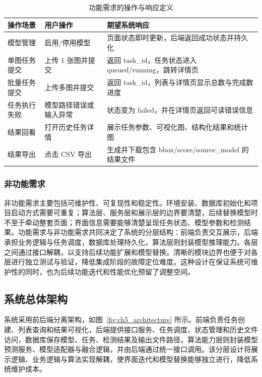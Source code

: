 \begin{table}[H]
  \centering
  \small
  \caption{功能需求的操作与响应定义}
  \label{tab:ch5_requirement_response}
  \begin{tabular}{p{3.2cm}p{4.6cm}p{5.1cm}}
    \toprule
    操作场景 & 用户操作 & 期望系统响应 \\
    \midrule
    模型管理 & 启用/停用模型 & 页面状态即时更新，后端返回成功状态并持久化 \\
    单图任务提交 & 上传 1 张图并提交 & 返回 task\_id，任务状态进入 queued/running，跳转详情页 \\
    批量任务提交 & 上传多图并提交 & 返回 task\_id，列表与详情页显示总数与完成数进度 \\
    任务执行失败 & 模型路径错误或输入异常 & 状态变为 failed，并在详情页返回可读错误信息 \\
    结果回看 & 打开历史任务详情 & 展示任务参数、可视化图、结构化结果和统计图 \\
    结果导出 & 点击 CSV 导出 & 生成并下载包含 bbox/score/source\_model 的结果文件 \\
    \bottomrule
  \end{tabular}
\end{table}

\subsubsection{非功能需求}

非功能需求主要包括可维护性、可复现性和稳定性。环境安装、数据库初始化和项目启动方式需要可重复；算法层、服务层和展示层的边界要清楚，后续替换模型时不至于牵动整套页面；界面信息需要能够清楚呈现任务状态、模型参数和检测结果。功能需求与非功能需求共同决定了系统的分层结构：前端负责交互展示，后端承担业务逻辑与任务调度，数据库处理持久化，算法层则封装模型推理能力。各层之间通过接口解耦，以支持后续功能扩展和模型替换。清晰的模块边界也便于对各层进行独立测试与验证，降低集成阶段的故障定位难度。这种设计在保证系统可维护性的同时，也为后续功能迭代和性能优化预留了调整空间。

\subsection{系统总体架构}

系统采用前后端分离架构，如图~\ref{fig:ch5_architecture} 所示。前端负责任务创建、列表查询和结果可视化，后端提供接口服务、任务调度、状态管理和历史文件访问，数据库保存模型、任务、检测结果及输出文件路径，算法能力层则封装模型预测服务、模型适配器与融合逻辑，并由后端通过统一接口调用。该分层设计将展示逻辑、业务逻辑与算法实现解耦，使界面迭代和模型替换能够独立进行，降低系统维护成本。

